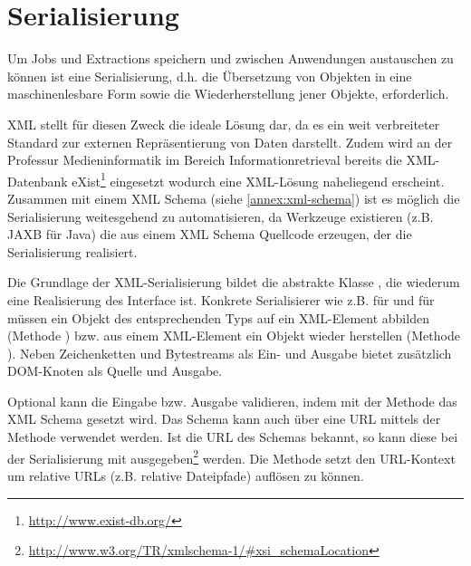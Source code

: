 \section{Serialisierung}
Um Jobs und Extractions speichern und zwischen Anwendungen austauschen zu können ist eine Serialisierung, d.h. die Übersetzung von Objekten in eine maschinenlesbare Form sowie die Wiederherstellung jener Objekte, erforderlich.

XML stellt für diesen Zweck die ideale Lösung dar, da es ein weit verbreiteter Standard zur externen Repräsentierung von Daten darstellt.
Zudem wird an der Professur Medieninformatik im Bereich Informationretrieval bereits die XML-Datenbank eXist\footnote{\url{http://www.exist-db.org/}} eingesetzt wodurch eine XML-Lösung naheliegend erscheint.
Zusammen mit einem XML Schema (siehe \autoref{annex:xml-schema}) ist es möglich die Serialisierung weitesgehend zu automatisieren, da Werkzeuge existieren (z.B. JAXB für Java) die aus einem XML Schema Quellcode erzeugen, der die Serialisierung realisiert.

Die Grundlage der XML-Serialisierung bildet die abstrakte Klasse , die wiederum eine Realisierung des Interface  ist.
Konkrete Serialisierer wie z.B.  für  und  für  müssen ein Objekt des entsprechenden Typs auf ein XML-Element abbilden (Methode ) bzw. aus einem XML-Element ein Objekt wieder herstellen (Methode ).
Neben Zeichenketten und Bytestreams als Ein- und Ausgabe bietet  zusätzlich DOM-Knoten als Quelle und Ausgabe.

Optional kann  die Eingabe bzw. Ausgabe validieren, indem mit der Methode  das XML Schema gesetzt wird.
Das Schema kann auch über eine URL mittels der Methode  verwendet werden.
Ist die URL des Schemas bekannt, so kann diese bei der Serialisierung mit ausgegeben\footnote{\url{http://www.w3.org/TR/xmlschema-1/\#xsi_schemaLocation}} werden.
Die Methode  setzt den URL-Kontext um relative URLs (z.B. relative Dateipfade) auflösen zu können.


